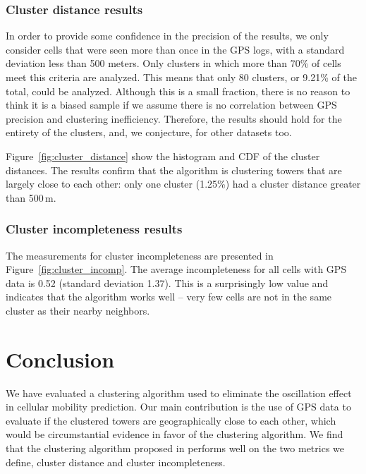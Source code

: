 \documentclass[letterpaper, 12pt, conference]{ieeeconf}
\begin{document}
\subsubsection{Cluster distance results}

In order to provide some confidence in the precision of the results, we only 
consider cells that were seen more than once in the GPS logs, with a standard 
deviation less than 500 meters. Only clusters in which more than 70\% of cells 
meet this criteria are analyzed. This means that only 80 clusters, or 9.21\% 
of the total, could be analyzed. Although this is a small fraction, there is 
no reason to think it is a biased sample if we assume there is no correlation 
between GPS precision and clustering inefficiency. Therefore, the results 
should hold for the entirety of the clusters, and, we conjecture, for other 
datasets too.

Figure~\ref{fig:cluster_distance} show the histogram and CDF of the cluster 
distances. The results confirm that the algorithm is clustering towers that 
are largely close to each other: only one cluster (1.25\%) had a cluster 
distance greater than 500\,m.

\subsubsection{Cluster incompleteness results}

The measurements for cluster incompleteness are presented in
Figure~\ref{fig:cluster_incomp}. The average incompleteness for all cells with GPS data 
is 0.52 (standard deviation 1.37). This is a surprisingly low value and 
indicates that the algorithm works well -- very few cells are not in the same 
cluster as their nearby neighbors.

\section{Conclusion}
\label{sec:conclusion}
We have evaluated a clustering algorithm used to eliminate the oscillation 
effect in cellular mobility prediction. Our main contribution is the use of 
GPS data to evaluate if the clustered towers are geographically close to each 
other, which would be circumstantial evidence in favor of the clustering 
algorithm. We find that the clustering algorithm proposed in \cite{
mobilityprofiler} performs well on the two metrics we define, cluster 
distance and cluster incompleteness.
\end{document}
